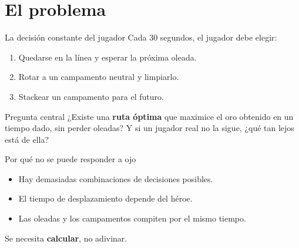 \section{El problema}

\begin{frame}{La decisión constante del jugador}
  Cada 30 segundos, el jugador debe elegir:
  \begin{enumerate}
    \item Quedarse en la línea y esperar la próxima oleada.
    \item Rotar a un campamento neutral y limpiarlo.
    \item Stackear un campamento para el futuro.
  \end{enumerate}
  \vspace{0.8em}
  \begin{block}{Pregunta central}
    ¿Existe una \textbf{ruta óptima} que maximice el oro obtenido en un tiempo dado, sin perder oleadas? Y si un jugador real no la sigue, ¿qué tan lejos está de ella?
  \end{block}
\end{frame}

\begin{frame}{Por qué no se puede responder a ojo}
  \begin{itemize}
    \item Hay demasiadas combinaciones de decisiones posibles.
    \item El tiempo de desplazamiento depende del héroe.
    \item Las oleadas y los campamentos compiten por el mismo tiempo.
  \end{itemize}
  \vspace{0.8em}
  \begin{center}
    \Large Se necesita \textbf{calcular}, no adivinar.
  \end{center}
\end{frame}
